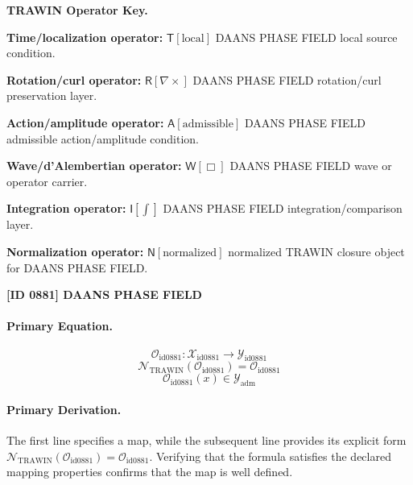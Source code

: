 \par\vspace{0.45\baselineskip}
\noindent\begin{minipage}[t]{\linewidth}
\begingroup
\small
\raggedright
\textbf{TRAWIN Operator Key.}\par
\noindent\textbf{Time/localization operator:} $\mathsf{T}\!\left[\mathrm{local}\right]$ DAANS PHASE FIELD local source condition.\par
\noindent\textbf{Rotation/curl operator:} $\mathsf{R}\!\left[\nabla\times\right]$ DAANS PHASE FIELD rotation/curl preservation layer.\par
\noindent\textbf{Action/amplitude operator:} $\mathsf{A}\!\left[\mathrm{admissible}\right]$ DAANS PHASE FIELD admissible action/amplitude condition.\par
\noindent\textbf{Wave/d'Alembertian operator:} $\mathsf{W}\!\left[\Box\right]$ DAANS PHASE FIELD wave or operator carrier.\par
\noindent\textbf{Integration operator:} $\mathsf{I}\!\left[\int\right]$ DAANS PHASE FIELD integration/comparison layer.\par
\noindent\textbf{Normalization operator:} $\mathsf{N}\!\left[\mathrm{normalized}\right]$ normalized TRAWIN closure object for DAANS PHASE FIELD.\par
\endgroup
\end{minipage}

\clearpage
\noindent\textbf{[ID 0881] DAANS PHASE FIELD}\par
\vspace{0.35em}
\paragraph{Primary Equation.}
\[
\mathcal{O}_{\mathrm{id0881}}:\mathcal{X}_{\mathrm{id0881}}\longrightarrow\mathcal{Y}_{\mathrm{id0881}}
\]
\[
\mathcal{N}_{\mathrm{TRAWIN}}(\mathcal{O}_{\mathrm{id0881}})=\mathcal{O}_{\mathrm{id0881}}
\]
\[
\mathcal{O}_{\mathrm{id0881}}(x)\in\mathcal{Y}_{\mathrm{adm}}
\]

\paragraph{Primary Derivation.}
The first line specifies a map, while the subsequent line provides its explicit form \( \mathcal{N}_{\mathrm{TRAWIN}}(\mathcal{O}_{\mathrm{id0881}})=\mathcal{O}_{\mathrm{id0881}} \). Verifying that the formula satisfies the declared mapping properties confirms that the map is well defined.
